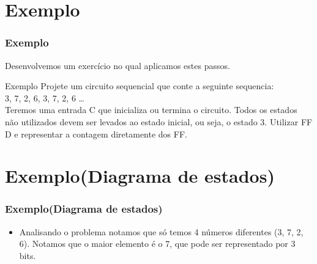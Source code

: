 \documentclass{beamer}
\begin{document}
\section{Exemplo}
\begin{frame}
  \frametitle{Exemplo}
  Desenvolvemos um exercício no qual aplicamos estes passos.\pause
  \begin{center}
   \begin{block}{Exemplo}
    Projete um circuito sequencial que conte a seguinte sequencia: \\3, 7, 2, 6, 3, 7, 2, 6 … \\ Teremos uma entrada C que inicializa ou termina o circuito. 
    Todos os estados não utilizados devem ser levados ao estado inicial, ou seja, o estado 3. Utilizar FF D e representar a contagem diretamente dos FF.
   \end{block}
  \end{center}

\end{frame}

\section{Exemplo(Diagrama de estados)}
\begin{frame}
  \frametitle{Exemplo(Diagrama de estados)}
  \begin{itemize}
   \item Analisando o problema notamos que só temos 4 números diferentes (3, 7, 2, 6). Notamos que o maior elemento é o 7, que pode ser representado por 3 bits.\pause
  \end{itemize}

\end{frame}
\end{document}
